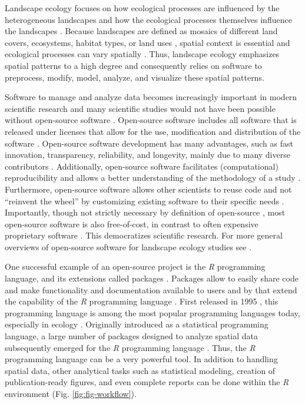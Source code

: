 \documentclass[smallextended]{svjour3}       %
\begin{document}
Landscape ecology focuses on how ecological processes are influenced by the heterogeneous landscapes and how the ecological processes themselves influence the landscapes \cite{Turner1989,Turner2005,With2019}.
Because landscapes are defined as mosaics of different land covers, ecosystems, habitat types, or land uses \cite{Forman1986,Forman1995,Wiens1995a}, spatial context is essential and ecological processes can vary spatially \cite{With2019}.
Thus, landscape ecology emphasizes spatial patterns to a high degree \cite{Risser1984} and consequently relies on software to preprocess, modify, model, analyze, and visualize these spatial patterns.

Software to manage and analyze data becomes increasingly important in modern scientific research \cite{Wilson2014} and many scientific studies would not have been possible without open-source software \cite{Prlic2012}.
Open-source software includes all software that is released under licenses that allow for the use, modification and distribution of the software \cite{St.Laurent2008}.
Open-source software development has many advantages, such as fast innovation, transparency, reliability, and longevity, mainly due to many diverse contributors \cite{vonKrogh2006,St.Laurent2008}.
Additionally, open-source software facilitates (computational) reproducibility and allows a better understanding of the methodology of a study \cite{Prlic2012,Powers2019}.
Furthermore, open-source software allows other scientists to reuse code and not ``reinvent the wheel'' \cite{Prlic2012} by customizing existing software to their specific needs \cite{Steiniger2009}.
Importantly, though not strictly necessary by definition of open-source \cite{Steiniger2009,Steiniger2009a}, most open-source software is also free-of-cost, in contrast to often expensive proprietary software \cite{vonKrogh2006,Steiniger2009,Steiniger2009a}.
This democratizes scientific research.
For more general overviews of open-source software for landscape ecology studies see \cite{Jolma2008,Steiniger2009,Steiniger2009a,Istvan2012}.

One successful example of an open-source project is the \textit{R} programming language, and its extensions called packages \cite{RCoreTeam2019}.
Packages allow to easily share code and make functionality and documentation available to users and by that extend the capability of the \textit{R} programming language \cite{Wickham2015}.
First released in 1995 \cite{Smith2016}, this programming language is among the most popular programming languages today, especially in ecology \cite{Lai2019}.
Originally introduced as a statistical programming language, a large number of packages designed to analyze spatial data subsequently emerged for the \textit{R} programming language \cite{Bivand2006,Lovelace2019}.
Thus, the \textit{R} programming language can be a very powerful tool.
In addition to handling spatial data, other analytical tasks such as statistical modeling, creation of publication-ready figures, and even complete reports can be done within the \textit{R} environment (Fig. \ref{fig:fig-workflow}).
\end{document}
